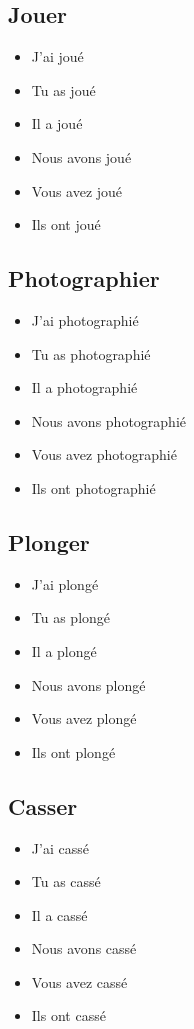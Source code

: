 \subsection{Jouer}

\begin{itemize}
    \item J'ai joué
    \item Tu as joué 
    \item Il a joué 
    \item Nous avons joué 
    \item Vous avez joué 
    \item Ils ont joué
\end{itemize}

\subsection{Photographier}

\begin{itemize}
    \item J'ai photographié
    \item Tu as photographié
    \item Il a photographié
    \item Nous avons photographié
    \item Vous avez photographié
    \item Ils ont photographié
\end{itemize}

\subsection{Plonger}

\begin{itemize}
    \item J'ai plongé 
    \item Tu as plongé 
    \item Il a plongé 
    \item Nous avons plongé 
    \item Vous avez plongé
    \item Ils ont plongé 
\end{itemize}

\subsection{Casser}

\begin{itemize}
    \item J'ai cassé 
    \item Tu as cassé 
    \item Il a cassé 
    \item Nous avons cassé 
    \item Vous avez cassé 
    \item Ils ont cassé 
\end{itemize}

